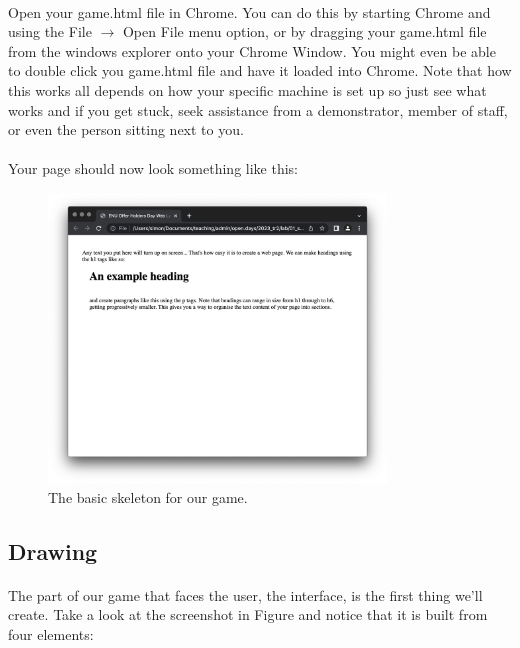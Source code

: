 \documentclass[10pt, a4paper, oneside]{article}
\begin{document}
\paragraph{} Open your game.html file in Chrome. You can do this by starting Chrome and using the File $\to$ Open File menu option, or by dragging your game.html file from the windows explorer onto your Chrome Window. You might even be able to double click you game.html file and have it loaded into Chrome. Note that how this works all depends on how your specific machine is set up so just see what works and if you get stuck, seek assistance from a demonstrator, member of staff, or even the person sitting next to you.

\paragraph{} Your page should now look something like this:

\begin{figure}[H]
\centering
\includegraphics[width=0.8\textwidth]{images/01_skeleton+skeleton.png}
\caption{The basic skeleton for our game.}
\label{fig:01_skeleton+skeleton}
\end{figure}


\subsection{Drawing}

\paragraph{} The part of our game that faces the user, the interface, is the first thing we'll create. Take a look at the screenshot in Figure \cite{fig:breakout} and notice that it is built from four elements:
\end{document}
